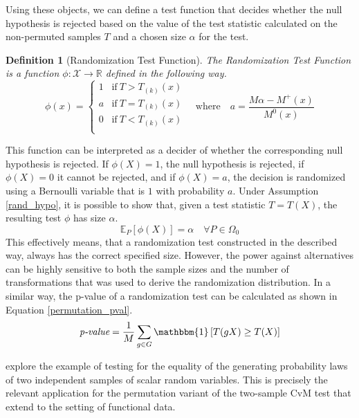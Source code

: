 \documentclass[12pt, a4paper]{article}
\theoremstyle{MAstyle} \newtheorem{assumption}{Assumption}[section]
\theoremstyle{MAstyle} \newtheorem{definition}{Definition}[section]
\theoremstyle{MAstyle} \newtheorem{theorem}{Theorem}[section]
\begin{document}
			Using these objects, we can define a test function that decides whether the null hypothesis is rejected based on the value of the test statistic calculated on the non-permuted samples $T$ and a chosen size $\alpha$ for the test.
			\begin{definition}[Randomization Test Function]\label{RandTestFunc}
				The Randomization Test Function is a function $\phi: \mathcal{X} \rightarrow \mathbb{R}$ defined in the following way.
					\begin{equation*}
						\phi(x) = \begin{cases}
							1 &\text{if} \ T > T_{(k)}(x) \\
							a &\text{if} \ T = T_{(k)}(x) \\
							0 &\text{if} \ T < T_{(k)}(x) \\
						\end{cases} \quad \text{where} \quad
						a = \frac{M\alpha - M^{+}(x)}{M^{0}(x)}
					\end{equation*}
				
			\end{definition}
			This function can be interpreted as a decider of whether the corresponding null hypothesis is rejected. If $\phi(X) = 1$, the null hypothesis is rejected, if $\phi(X) = 0$ it cannot be rejected, and if $\phi(X) = a$, the decision is randomized using a Bernoulli variable that is $1$ with probability $a$. 
			Under Assumption \ref{rand_hypo}, it is possible to show that, given a test statistic $T = T(X)$, the resulting test $\phi$ has size $\alpha$.
			\begin{equation}
				\mathbb{E}_{P}\left[\phi(X)\right] = \alpha \quad \forall P \in \Omega_0
			\end{equation}
			This effectively means, that a randomization test constructed in the described way, always has the correct specified size. However, the power against alternatives can be highly sensitive to both the sample sizes and the number of transformations that was used to derive the randomization distribution.	
			In a similar way, the p-value of a randomization test can be calculated as shown in Equation \ref{permutation_pval}.
			\begin{equation}\label{permutation_pval}
				\textit{p-value} = \frac{1}{M} \sum_{g \in G} \mathbbm{1}\left[T(gX) \geq T(X)\right]
			\end{equation}
					
			\cite{lehmann_testing_2005} explore the example of testing for the equality of the generating probability laws of two independent samples of scalar random variables. This is precisely the relevant application for the permutation variant of the two-sample CvM test that \cite{bugni_permutation_2021} extend to the setting of functional data. \\
			
\end{document}
